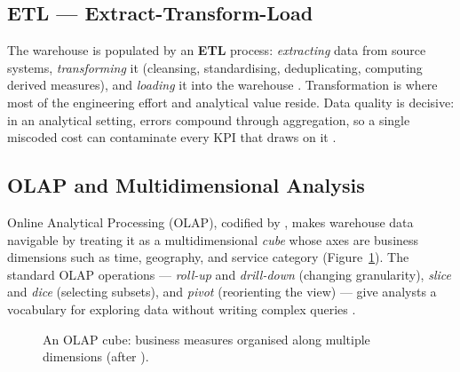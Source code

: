 \subsection{ETL --- Extract-Transform-Load}

The warehouse is populated by an \textbf{ETL} process: \emph{extracting} data from source systems,
\emph{transforming} it (cleansing, standardising, deduplicating, computing derived measures), and
\emph{loading} it into the warehouse \parencite{vassiliadis2009}. Transformation is where most of the
engineering effort and analytical value reside. Data quality is decisive: in an analytical setting,
errors compound through aggregation, so a single miscoded cost can contaminate every KPI that draws on
it \parencite{olson2003}.

\subsection{OLAP and Multidimensional Analysis}

Online Analytical Processing (OLAP), codified by \textcite{codd1993}, makes warehouse data navigable by
treating it as a multidimensional \emph{cube} whose axes are business dimensions such as time,
geography, and service category (Figure~\ref{fig:ch1-olap-cube}). The standard OLAP operations ---
\emph{roll-up} and \emph{drill-down} (changing granularity), \emph{slice} and \emph{dice} (selecting
subsets), and \emph{pivot} (reorienting the view) --- give analysts a vocabulary for exploring data
without writing complex queries \parencite{han2011}.

\begin{figure}[htbp]
\centering
{}
\caption{An OLAP cube: business measures organised along multiple dimensions (after \textcite{codd1993}).}
\label{fig:ch1-olap-cube}
\end{figure}

